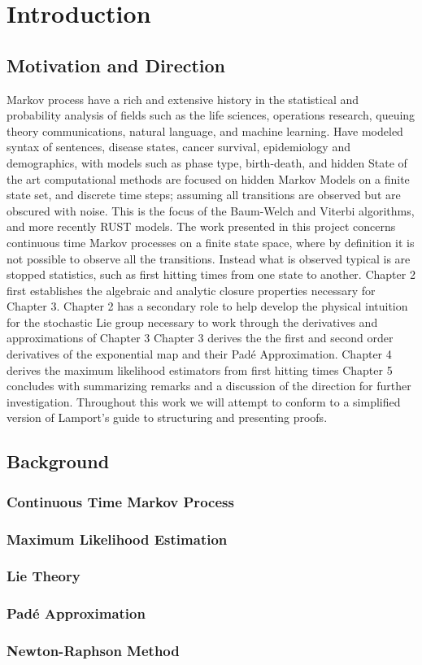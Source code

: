\chapter{Introduction}
\section{Motivation and Direction}
Markov process have a rich and extensive history in the statistical and 
probability analysis of fields such as the life sciences, operations research,
queuing theory communications, natural language, and machine learning.
Have modeled syntax of sentences, disease states, cancer survival, epidemiology
and demographics, with models such as phase type, birth-death, and hidden
State of the art computational methods are focused on hidden Markov Models on
a finite state set, and discrete time steps; assuming all transitions are
observed but are obscured with noise. This is the focus of the Baum-Welch and
Viterbi algorithms, and more recently RUST models.
The work presented in this project concerns continuous time Markov processes on
a finite state space, where by definition it is not possible to observe all the
transitions. Instead what is observed typical is are stopped statistics, such
as first hitting times from one state to another.
Chapter 2 first establishes the algebraic and analytic closure properties
necessary for Chapter 3. Chapter 2 has a secondary role to help develop the 
physical intuition for the stochastic Lie group necessary to work through the 
derivatives and approximations of Chapter 3
Chapter 3 derives the the first and second order derivatives of the exponential
map and their Pad\'{e} Approximation.
Chapter 4 derives the maximum likelihood estimators from first hitting times
Chapter 5 concludes with summarizing remarks and a discussion of the direction
for further investigation.
Throughout this work we will attempt to conform to a simplified version of 
Lamport's guide to structuring and presenting proofs.
\section{Background}
\subsection{Continuous Time Markov Process}
\subsection{Maximum Likelihood Estimation}
\subsection{Lie Theory}
\subsection{Pad\'{e} Approximation}
\subsection{Newton-Raphson Method}
